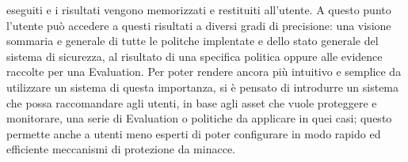 eseguiti e i risultati vengono memorizzati e restituiti all'utente. A questo punto l'utente può accedere a 
questi risultati a diversi gradi di precisione: una visione sommaria e generale di tutte le politche implentate e dello stato generale 
del sistema di sicurezza, al risultato di una specifica politica oppure alle evidence raccolte per una Evaluation.\hfill\break
Per poter rendere ancora più intuitivo e semplice da utilizzare un sistema di questa importanza, si è pensato di introdurre un sistema
che possa raccomandare agli utenti, in base agli asset che vuole proteggere e monitorare, una serie di Evaluation o politiche da
applicare in quei casi; questo permette anche a utenti meno esperti di poter configurare in modo rapido ed efficiente meccanismi di
protezione da minacce.
